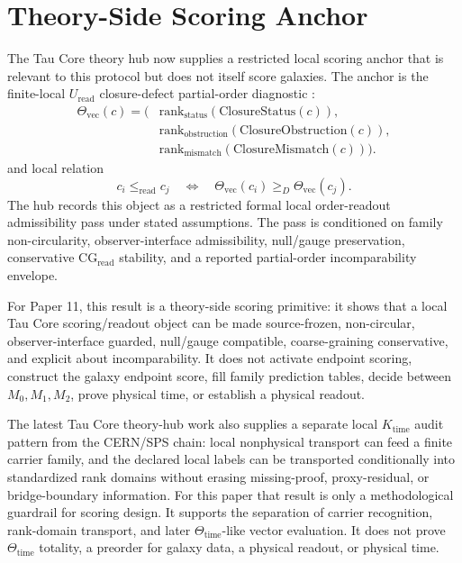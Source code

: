 \documentclass[11pt]{article}
\begin{document}
\section{Theory-Side Scoring Anchor}

The Tau Core theory hub now supplies a restricted local scoring anchor that is
relevant to this protocol but does not itself score galaxies. The anchor is the
finite-local \(U_{\mathrm{read}}\) closure-defect partial-order diagnostic
\cite{tauCoreTheoryHub2026}:
\[
\begin{aligned}
\Theta_{\mathrm{vec}}(c)=(&
\mathrm{rank}_{\mathrm{status}}(\mathrm{ClosureStatus}(c)),\\
&\mathrm{rank}_{\mathrm{obstruction}}(\mathrm{ClosureObstruction}(c)),\\
&\mathrm{rank}_{\mathrm{mismatch}}(\mathrm{ClosureMismatch}(c))).
\end{aligned}
\]
and local relation
\[
c_i \leq_{\mathrm{read}} c_j
\quad\Longleftrightarrow\quad
\Theta_{\mathrm{vec}}(c_i)\geq_D \Theta_{\mathrm{vec}}(c_j).
\]
The hub records this object as a restricted formal local order-readout
admissibility pass under stated assumptions. The pass is conditioned on
family non-circularity, observer-interface admissibility, null/gauge
preservation, conservative \(\mathrm{CG}_{\mathrm{read}}\) stability, and a
reported partial-order incomparability envelope.

For Paper 11, this result is a theory-side scoring primitive: it shows that a
local Tau Core scoring/readout object can be made source-frozen,
non-circular, observer-interface guarded, null/gauge compatible,
coarse-graining conservative, and explicit about incomparability. It does not activate endpoint scoring, construct the galaxy endpoint score, fill family
prediction tables, decide between \(M_0,M_1,M_2\), prove physical time, or
establish a physical readout.

The latest Tau Core theory-hub work also supplies a separate local
\(K_{\mathrm{time}}\) audit pattern from the CERN/SPS chain: local nonphysical
transport can feed a finite carrier family, and the declared local labels can
be transported conditionally into standardized rank domains without erasing
missing-proof, proxy-residual, or bridge-boundary information. For this paper
that result is only a methodological guardrail for scoring design. It supports
the separation of carrier recognition, rank-domain transport, and later
\(\Theta_{\mathrm{time}}\)-like vector evaluation. It does not prove
\(\Theta_{\mathrm{time}}\) totality, a preorder for galaxy data, a physical
readout, or physical time.
\end{document}
